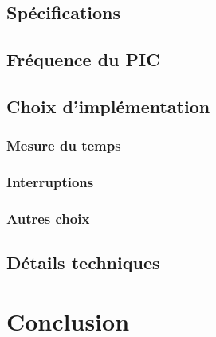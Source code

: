 \documentclass[12pt,a4paper]{article}
\begin{document}
    \subsection{Spécifications}
    \subsection{Fréquence du PIC}
    \subsection{Choix d'implémentation}
    \subsubsection{Mesure du temps}
    \subsubsection{Interruptions}
    \subsubsection{Autres choix}
    \subsection{Détails techniques}
    
\section{Conclusion}
    
\end{document}

